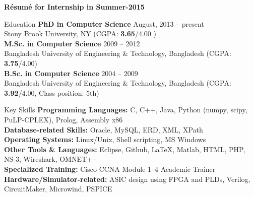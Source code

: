\documentclass{resume} %
\begin{document}
 \titlespacing{\section}{0pt}{\parskip}{-\parskip}
 \begin{center}
 {\Small \normalfont \textbf{R\'esum\'e for Internship in Summer-2015}}
 \end{center}
\begin{rSection}{Education}
{\bf PhD in Computer Science} \hfill {August, 2013 -- present} \\ 
Stony Brook University, NY (CGPA: \textbf{3.65}/4.00 ) \\ [4pt]
{\bf M.Sc. in Computer Science} \hfill {2009 -- 2012} \\ 
Bangladesh University of Engineering \& Technology, Bangladesh (CGPA:
\textbf{3.75}/4.00) \\[4pt] {\bf B.Sc. in Computer Science} \hfill {2004 --
2009}
\\
Bangladesh University of Engineering \& Technology, Bangladesh (CGPA:
\textbf{3.92}/4.00, Class position: 5th)
\end{rSection}
\begin{rSection}{Key Skills}
\textbf{Programming Languages: }C, C++, Java, Python (numpy, scipy, PuLP-CPLEX),
Prolog, Assembly x86
\\
\textbf{Database-related Skills: } Oracle, MySQL, ERD, XML, XPath\\ 
\textbf{Operating Systems: }Linux/Unix, Shell scripting, MS Windows\\
\textbf{Other Tools \& Languages: }Eclipse, Github, \LaTeX{}, Matlab, HTML,
PHP, NS-3, Wireshark, OMNET++\\
\textbf{Specialized Training: }Cisco CCNA Module 1--4 Academic Trainer \\
\textbf{Hardware/Simulator-related:} ASIC design using FPGA and PLDs,
Verilog, CircuitMaker, Microwind, PSPICE
\end{rSection}   
\end{document}
